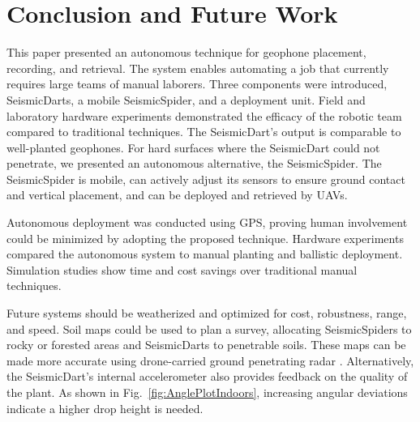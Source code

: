  \section{Conclusion and Future Work}\label{sec:Conclusion}
This paper presented an autonomous technique for geophone placement, recording, and retrieval. The system enables automating a job that currently requires large teams of manual laborers. Three components were introduced, SeismicDarts, a mobile SeismicSpider, and a deployment unit.
Field and laboratory hardware experiments demonstrated the efficacy of the robotic team compared to traditional techniques. 
The SeismicDart's output is comparable to well-planted geophones. 
For hard surfaces where the SeismicDart could not penetrate, we presented an autonomous alternative, the SeismicSpider.  
The SeismicSpider is mobile, can actively adjust its sensors to ensure ground contact and vertical placement, and can be deployed and retrieved by UAVs.

Autonomous deployment was conducted using GPS, proving human involvement could be minimized by adopting the proposed technique. 
Hardware experiments compared the autonomous system to manual planting and ballistic deployment.
Simulation studies show time and cost savings over traditional manual techniques.

Future systems should be weatherized and optimized for cost, robustness, range, and speed. 
Soil maps could be used to plan a survey, allocating SeismicSpiders to rocky or forested areas and SeismicDarts to penetrable soils. 
These maps can be made more accurate using drone-carried ground penetrating radar \cite{merz2015new}. Alternatively, the  SeismicDart's internal accelerometer also provides feedback on the quality of the plant. As shown in Fig.~\ref{fig:AnglePlotIndoors}, increasing angular deviations indicate a higher drop height is needed.  

